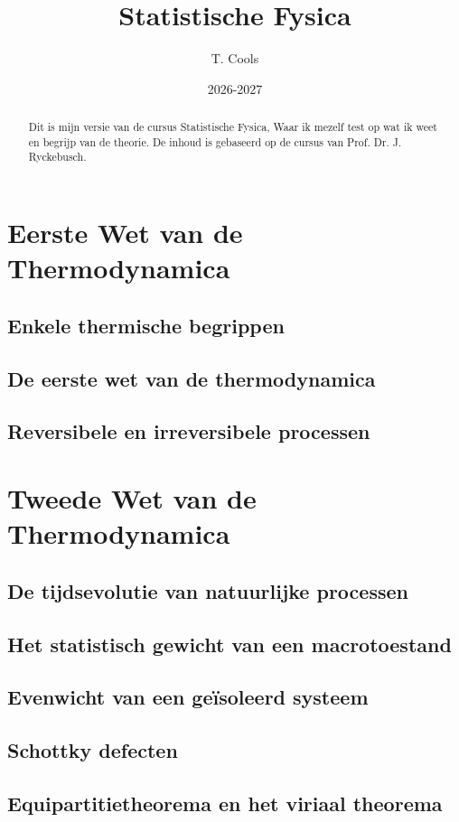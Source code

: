 \documentclass[a4paper,twoside]{article}
\title{Statistische Fysica}
\author{T. Cools}
\date{2026-2027}
\theoremstyle{definition}
\theoremstyle{plain}
\begin{document}
\maketitle

\begin{abstract}
    Dit is mijn versie van de cursus Statistische Fysica, Waar ik mezelf test op wat ik weet en begrijp van de theorie.
     De inhoud is gebaseerd op de cursus van Prof. Dr. J. Ryckebusch.
\end{abstract}

\tableofcontents


\section{Eerste Wet van de Thermodynamica}
\subsection{Enkele thermische begrippen}
\subsection{De eerste wet van de thermodynamica}
\subsection{Reversibele en irreversibele processen}

\section{Tweede Wet van de Thermodynamica}
\subsection{De tijdsevolutie van natuurlijke processen}
\subsection{Het statistisch gewicht van een macrotoestand}
\subsection{Evenwicht van een ge\"isoleerd systeem}
\subsection{Schottky defecten}
\subsection{Equipartitietheorema en het viriaal theorema}
\end{document}
